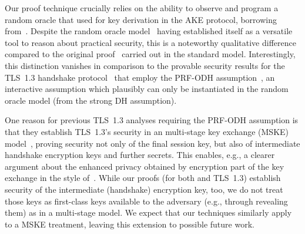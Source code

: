 Our proof technique crucially relies on the ability to observe and program a random oracle that used for key derivation in the AKE protocol, borrowing from~\cite{C:CCGJJ19}.
Despite the random oracle model~\cite{CCS:BelRog93} having established itself as a versatile tool to reason about practical security, this is a noteworthy qualitative difference compared to the original \SIGMA proof~\cite{C:CanKra02} carried out in the standard model.
Interestingly, this distinction vanishes in comparison to the provable security results for the TLS~1.3 handshake protocol~\cite{CCS:DFGS15,EPRINT:DFGS16,EuroSP:FisGue17} that employ the PRF-ODH assumption~\cite{C:JKSS12,C:BFGJ17},
an interactive assumption which plausibly can only be instantiated in the random oracle model (from the strong DH assumption).

One reason for previous TLS~1.3 analyses requiring the PRF-ODH assumption is that they establish TLS~1.3's security in an multi-stage key exchange (MSKE) model~\cite{CCS:FisGue14}, proving security not only of the final session key, but also of intermediate handshake encryption keys and further secrets.
This enables, e.g., a clearer argument about the enhanced privacy obtained by encryption part of the key exchange in the style of~\SIGMAI.
While our proofs (for both \SIGMAI and TLS~1.3) establish security of the intermediate (handshake) encryption key, too,
we do not treat those keys as first-class keys available to the adversary (e.g., through revealing them) as in a multi-stage model.
We expect that our techniques similarly apply to a MSKE treatment, leaving this extension to possible future work.


